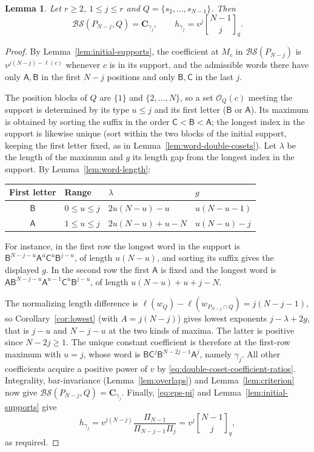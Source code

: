 \documentclass[11pt,a4paper,reqno]{amsart}
\numberwithin{equation}{section}
\newtheorem{lemma}[theorem]{Lemma}
\theoremstyle{definition}
\theoremstyle{remark}
\theoremstyle{plain}
\newcommand{\C}{\mathbf C}
\newcommand{\A}{\mathsf A}
\newcommand{\B}{\mathsf B}
\newcommand{\CC}{\mathsf C}
\newcommand{\gb}[2]{\genfrac{[}{]}{0pt}{}{#1}{#2}_q}
\newcommand{\D}{\mathcal {BS}}
\begin{document}
\begin{lemma}\label{lem:gaussian-products}
Let $r\geq2$, $1\leq j\leq r$ and $Q=\{s_2,\ldots,s_{N-1}\}$. Then
\begin{equation}\label{eq:gaussian-products}
 \D(P_{N-j},Q)=\C_{\gamma_j},\qquad h_{\gamma_j}=v^j\gb{N-1}{j}.
\end{equation}
\end{lemma}
\begin{proof}
By Lemma~\ref{lem:initial-supports}, the coefficient at $M_c$ in $\D(P_{N-j})$ is $v^{j(N-j)-\ell(c)}$ whenever $c$ is in its support, and
the admissible words there have only $\A,\B$ in the first $N-j$ positions and only $\B,\CC$ in the last $j$.

The position blocks of $Q$ are $\{1\}$ and $\{2,\ldots,N\}$, so a set $\mathcal O_Q(c)$ meeting the support is determined by its
type $u\leq j$ and its first letter ($\B$ or $\A$). Its maximum is obtained by sorting the suffix in the order $\CC<\B<\A$;
the longest index in the support is likewise unique (sort within the two blocks of the initial support, keeping the first letter fixed, as in
Lemma~\ref{lem:word-double-cosets}). Let $\lambda$ be the length of the maximum and $g$ its length gap from the longest index in the support. By
Lemma~\ref{lem:word-length}:
\begin{center}
\begin{tabular}{@{}clll@{}}
\toprule
First letter & Range & $\lambda$ & $g$\\\midrule
$\B$ & $0\leq u\leq j$ & $2u(N-u)-u$ & $u(N-u-1)$\\
$\A$ & $1\leq u\leq j$ & $2u(N-u)+u-N$ & $u(N-u)-j$\\\bottomrule
\end{tabular}
\end{center}
For instance, in the first row the longest word in the support is $\B^{N-j-u}\A^u\CC^u\B^{j-u}$, of length $u(N-u)$, and sorting its suffix gives the
displayed $g$. In the second row the first $\A$ is fixed and the longest word is $\A\B^{N-j-u}\A^{u-1}\CC^u\B^{j-u}$, of length $u(N-u)+u+j-N$.

The normalizing length difference is $\ell(w_Q)-\ell(w_{P_{N-j}\cap Q})=j(N-j-1)$, so Corollary~\ref{cor:lowest} (with $A=j(N-j)$) gives lowest exponents
$j-\lambda+2g$, that is $j-u$ and $N-j-u$ at the two kinds of maxima. The latter is positive since $N-2j\geq1$. The unique constant coefficient is
therefore at the first-row maximum with $u=j$, whose word is $\B\CC^j\B^{N-2j-1}\A^j$, namely $\gamma_j$. All other coefficients acquire a positive
power of $v$ by \eqref{eq:double-coset-coefficient-ratios}. Integrality, bar-invariance (Lemma~\ref{lem:overlaps}) and
Lemma~\ref{lem:criterion} now give $\D(P_{N-j},Q)=\C_{\gamma_j}$.
%
Finally, \eqref{eq:eps-pi} and Lemma~\ref{lem:initial-supports} give
\[
 h_{\gamma_j}=v^{j(N-j)}\frac{\Pi_{N-1}}{\Pi_{N-j-1}\Pi_j}=v^j\gb{N-1}{j},
\]
as required.
\end{proof}
\end{document}
